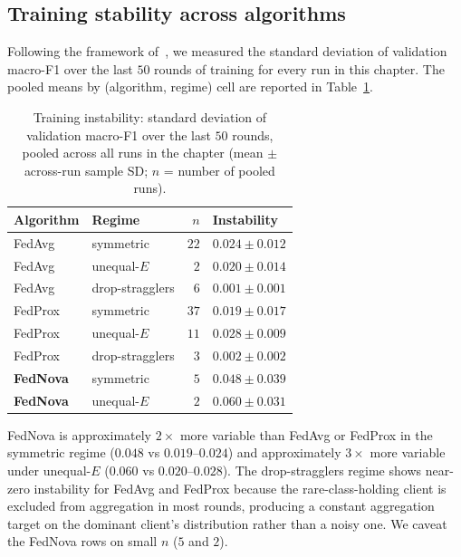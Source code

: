 \documentclass[11pt,a4paper]{report}
\begin{document}
\subsection{Training stability across algorithms}
\label{sec:robustness-stability}

Following the framework of~\citet{charles2024stability}, we measured the
standard deviation of validation macro-F1 over the last $50$ rounds of
training for every run in this chapter. The pooled means by (algorithm,
regime) cell are reported in Table~\ref{tab:training-instability}.

\begin{table}[!htbp]
\centering
\caption{Training instability: standard deviation of validation macro-F1
over the last $50$ rounds, pooled across all runs in the chapter
(mean $\pm$ across-run sample SD; $n$ = number of pooled runs).}
\label{tab:training-instability}
\small
\begin{tabular}{llrl}
\toprule
Algorithm & Regime & $n$ & Instability \\
\midrule
FedAvg   & symmetric         & $22$ & $0.024 \pm 0.012$ \\
FedAvg   & unequal-$E$        & $2$  & $0.020 \pm 0.014$ \\
FedAvg   & drop-stragglers   & $6$  & $0.001 \pm 0.001$ \\
FedProx  & symmetric         & $37$ & $0.019 \pm 0.017$ \\
FedProx  & unequal-$E$        & $11$ & $0.028 \pm 0.009$ \\
FedProx  & drop-stragglers   & $3$  & $0.002 \pm 0.002$ \\
\textbf{FedNova} & symmetric         & $5$  & $\mathbf{0.048 \pm 0.039}$ \\
\textbf{FedNova} & unequal-$E$        & $2$  & $\mathbf{0.060 \pm 0.031}$ \\
\bottomrule
\end{tabular}
\end{table}

FedNova is approximately $2{\times}$ more variable than FedAvg or FedProx
in the symmetric regime ($0.048$ vs $0.019$--$0.024$) and approximately
$3{\times}$ more variable under unequal-$E$ ($0.060$ vs $0.020$--$0.028$).
The drop-stragglers regime shows near-zero instability for FedAvg and
FedProx because the rare-class-holding client is excluded from
aggregation in most rounds, producing a constant aggregation target on
the dominant client's distribution rather than a noisy one. We caveat
the FedNova rows on small $n$ ($5$ and $2$).
\end{document}
